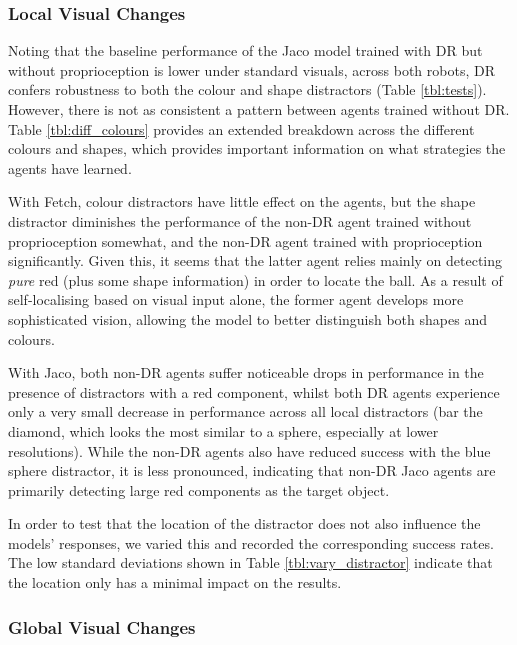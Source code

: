 \hypertarget{local-visual-changes}{%
\subsubsection{Local Visual Changes}\label{local-visual-changes}}

Noting that the baseline performance of the Jaco model trained with DR
but without proprioception is lower under standard visuals, across both
robots, DR confers robustness to both the colour and shape distractors
(Table \ref{tbl:tests}). However, there is not as consistent a pattern
between agents trained without DR. Table \ref{tbl:diff_colours} provides
an extended breakdown across the different colours and shapes, which
provides important information on what strategies the agents have
learned.

With Fetch, colour distractors have little effect on the agents, but the
shape distractor diminishes the performance of the non-DR agent trained
without proprioception somewhat, and the non-DR agent trained with
proprioception significantly. Given this, it seems that the latter agent
relies mainly on detecting \emph{pure} red (plus some shape information)
in order to locate the ball. As a result of self-localising based on
visual input alone, the former agent develops more sophisticated vision,
allowing the model to better distinguish both shapes and colours.

With Jaco, both non-DR agents suffer noticeable drops in performance in
the presence of distractors with a red component, whilst both DR agents
experience only a very small decrease in performance across all local
distractors (bar the diamond, which looks the most similar to a sphere,
especially at lower resolutions). While the non-DR agents also have
reduced success with the blue sphere distractor, it is less pronounced,
indicating that non-DR Jaco agents are primarily detecting large red
components as the target object.

In order to test that the location of the distractor does not also
influence the models' responses, we varied this and recorded the
corresponding success rates. The low standard deviations shown in Table
\ref{tbl:vary_distractor} indicate that the location only has a minimal
impact on the results.

\hypertarget{global-visual-changes}{%
\subsubsection{Global Visual Changes}\label{global-visual-changes}}


